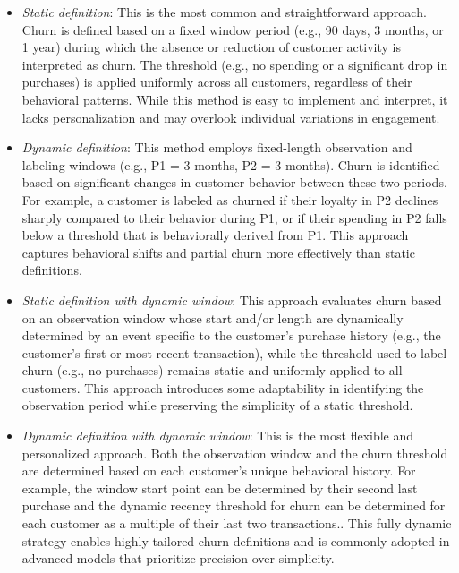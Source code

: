 \begin{itemize}
    \item \textit{Static definition}: This is the most common and straightforward approach. Churn is defined based on a fixed window period (e.g., 90 days, 3 months, or 1 year) during which the absence or reduction of customer activity is interpreted as churn. The threshold (e.g., no spending or a significant drop in purchases) is applied uniformly across all customers, regardless of their behavioral patterns. While this method is easy to implement and interpret, it lacks personalization and may overlook individual variations in engagement.
    
    \item \textit{Dynamic definition}: This method employs fixed-length observation and labeling windows (e.g., P1 = 3 months, P2 = 3 months). Churn is identified based on significant changes in customer behavior between these two periods. For example, a customer is labeled as churned if their loyalty in P2 declines sharply compared to their behavior during P1, or if their spending in P2 falls below a threshold that is behaviorally derived from P1. This approach captures behavioral shifts and partial churn more effectively than static definitions.
    
    \item \textit{Static definition with dynamic window}: 
    This approach evaluates churn based on an observation window whose start and/or length are dynamically determined by an event specific to the customer's purchase history (e.g., the customer's first or most recent transaction), while the threshold used to label churn (e.g., no purchases) remains static and uniformly applied to all customers.
    This approach introduces some adaptability in identifying the observation period while preserving the simplicity of a static threshold.
    
    \item \textit{Dynamic definition with dynamic window}: This is the most flexible and personalized approach. Both the observation window and the churn threshold are determined based on each customer’s unique behavioral history. For example, the window start point can be determined by their second last purchase and the dynamic recency threshold for churn can be determined for each customer as a multiple of their last two transactions.. This fully dynamic strategy enables highly tailored churn definitions and is commonly adopted in advanced models that prioritize precision over simplicity.


\end{itemize}
